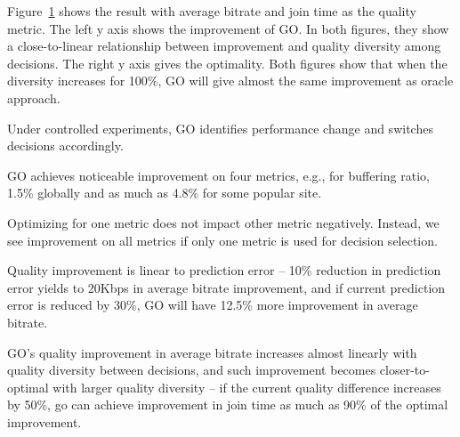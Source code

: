 \begin{figure}[h!]
\centering
{}
\hspace{-0.6cm}
\label{fig:trace-diversity}
\end{figure}

Figure~\ref{fig:trace-diversity} shows the result with average bitrate and join time as the quality metric. The left y axis shows the improvement of GO. In both figures, they show a close-to-linear relationship between improvement and quality diversity among decisions. 
The right y axis gives the optimality. Both figures show that when the diversity increases for 100\%, GO will give almost the same improvement as oracle approach.



\begin{packedenumerate}
	\item Under controlled experiments, GO identifies performance change and switches decisions accordingly.
	\item GO achieves noticeable improvement on four metrics, e.g., for buffering ratio, 1.5\% globally and as much as 4.8\% for some popular site.
	\item Optimizing for one metric does not impact other metric negatively. Instead, we see improvement on all metrics if only one metric is used for decision selection.
	\item Quality improvement is linear to prediction error -- 10\% reduction in prediction error yields to 20Kbps in average bitrate improvement, and if current prediction error is reduced by 30\%, GO will have 12.5\% more improvement in average bitrate.
	\item GO's quality improvement in average bitrate increases almost linearly with quality diversity between decisions, and such improvement becomes closer-to-optimal with larger quality diversity -- if the current quality difference increases by 50\%, go can achieve improvement in join time as much as 90\% of the optimal improvement.
\end{packedenumerate}


